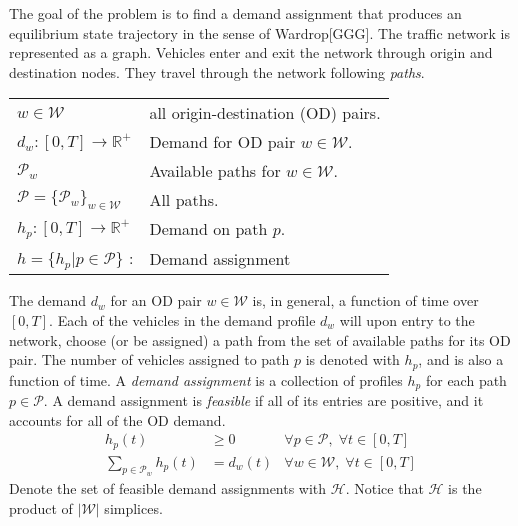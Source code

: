 The goal of the problem is to find a demand assignment that produces an equilibrium state trajectory in the sense of Wardrop[GGG]. The traffic network  is represented as a graph. Vehicles enter and exit the network through origin and destination nodes. They travel through the network following \textit{paths}. 

\vspace{1em}

\begin{tabular}{ll}
$w\in\mathcal{W}$ & all origin-destination (OD) pairs. \\ 
$d_w : [0,T]\rightarrow \mathbb{R}^+ $  & Demand for OD pair $w\in\mathcal{W}$. \\ 
$\mathcal{P}_w$ & Available paths for $w\in\mathcal{W}$. \\
$\mathcal{P}=\{ \mathcal{P}_w \}_{w\in \mathcal{W}}$ & All paths. \\ 
$h_p : [0,T]\rightarrow \mathbb{R}^+ $ & Demand on path $p$. \\
$h=\{h_p | p\in\mathcal{P}\}$ : & Demand assignment
\end{tabular}

\vspace{1em}

The demand $d_w$ for an OD pair $w\in\mathcal{W}$ is, in general, a function of time over $[0,T]$. Each of the vehicles in the demand profile $d_w$ will upon entry to the network, choose (or be assigned) a path from the set of available paths for its OD pair. The number of vehicles assigned to path $p$ is denoted with $h_p$, and is also a function of time. A \textit{demand assignment} is a collection of profiles $h_p$ for each path $p\in\mathcal{P}$. A demand assignment is \textit{feasible} if all of its entries are positive, and it accounts for all of the OD demand. 
\begin{align}
h_p(t) &\geq 0 & \forall p\in\mathcal{P},\;\forall t\in[0,T] \\
\sum_{p\in \mathcal{P}_w} h_p(t) &= d_w(t) & \forall w\in\mathcal{W}  ,\;\forall t\in[0,T] 
\end{align}
Denote the set of feasible demand assignments with $\mathcal{H}$. Notice that $\mathcal{H}$ is the product of $|\mathcal{W}|$ simplices.


